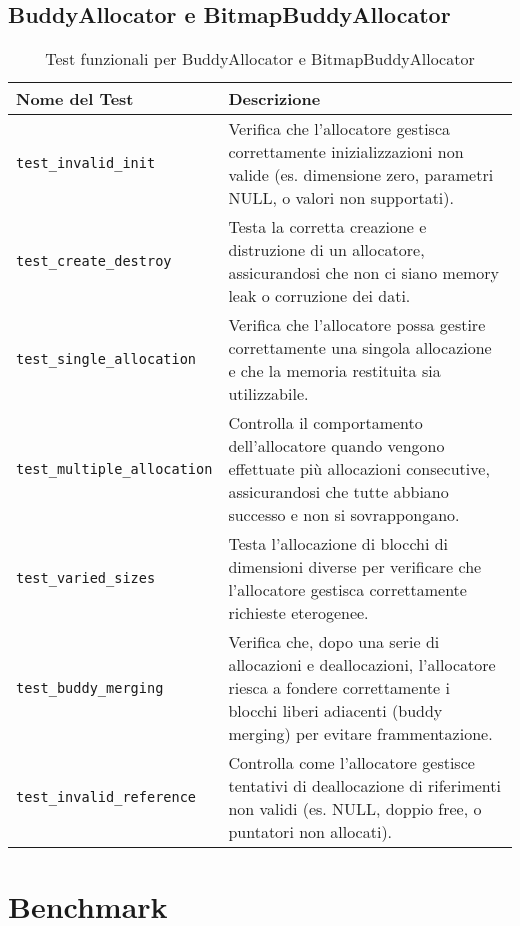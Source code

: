 \subsection*{BuddyAllocator e BitmapBuddyAllocator}
\begin{table}[H]
\centering
\begin{tabularx}{\textwidth}{|l|X|}
\hline
\textbf{Nome del Test} & \textbf{Descrizione} \\
\hline
\texttt{test\_invalid\_init} & Verifica che l'allocatore gestisca correttamente inizializzazioni non valide (es. dimensione zero, parametri NULL, o valori non supportati). \\
\hline
\texttt{test\_create\_destroy} & Testa la corretta creazione e distruzione di un allocatore, assicurandosi che non ci siano memory leak o corruzione dei dati. \\
\hline
\texttt{test\_single\_allocation} & Verifica che l'allocatore possa gestire correttamente una singola allocazione e che la memoria restituita sia utilizzabile. \\
\hline
\texttt{test\_multiple\_allocation} & Controlla il comportamento dell'allocatore quando vengono effettuate più allocazioni consecutive, assicurandosi che tutte abbiano successo e non si sovrappongano. \\
\hline
\texttt{test\_varied\_sizes} & Testa l'allocazione di blocchi di dimensioni diverse per verificare che l'allocatore gestisca correttamente richieste eterogenee. \\
\hline
\texttt{test\_buddy\_merging} & Verifica che, dopo una serie di allocazioni e deallocazioni, l'allocatore riesca a fondere correttamente i blocchi liberi adiacenti (buddy merging) per evitare frammentazione. \\
\hline
\texttt{test\_invalid\_reference} & Controlla come l'allocatore gestisce tentativi di deallocazione di riferimenti non validi (es. NULL, doppio free, o puntatori non allocati). \\
\hline
\end{tabularx}
\caption{Test funzionali per BuddyAllocator e BitmapBuddyAllocator}
\end{table}


\section{Benchmark}
